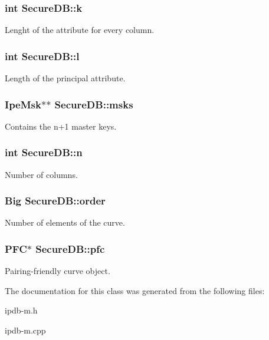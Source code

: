 \subsubsection[{\texorpdfstring{k}{k}}]{\setlength{\rightskip}{0pt plus 5cm}int Secure\+D\+B\+::k}\hypertarget{classSecureDB_a1c0171e735bb38a78af19fb5b530557a}{}\label{classSecureDB_a1c0171e735bb38a78af19fb5b530557a}
Lenght of the attribute for every column. 
\subsubsection[{\texorpdfstring{l}{l}}]{\setlength{\rightskip}{0pt plus 5cm}int Secure\+D\+B\+::l}\hypertarget{classSecureDB_ab8f7de0f939b03278cabc7d9c4d248df}{}\label{classSecureDB_ab8f7de0f939b03278cabc7d9c4d248df}
Length of the principal attribute. 
\subsubsection[{\texorpdfstring{msks}{msks}}]{\setlength{\rightskip}{0pt plus 5cm}Ipe\+Msk$\ast$$\ast$ Secure\+D\+B\+::msks}\hypertarget{classSecureDB_a7c64d61dc130f025e769937a0303e301}{}\label{classSecureDB_a7c64d61dc130f025e769937a0303e301}
Contains the n+1 master keys. 
\subsubsection[{\texorpdfstring{n}{n}}]{\setlength{\rightskip}{0pt plus 5cm}int Secure\+D\+B\+::n}\hypertarget{classSecureDB_ae034772516922899c09a0e2790dac008}{}\label{classSecureDB_ae034772516922899c09a0e2790dac008}
Number of columns. 
\subsubsection[{\texorpdfstring{order}{order}}]{\setlength{\rightskip}{0pt plus 5cm}Big Secure\+D\+B\+::order}\hypertarget{classSecureDB_ae2cdeef405f4711ca5e17c6052c1d78a}{}\label{classSecureDB_ae2cdeef405f4711ca5e17c6052c1d78a}
Number of elements of the curve. 
\subsubsection[{\texorpdfstring{pfc}{pfc}}]{\setlength{\rightskip}{0pt plus 5cm}P\+FC$\ast$ Secure\+D\+B\+::pfc}\hypertarget{classSecureDB_a3feb6fe6c3928b757edcf0a04573bb1a}{}\label{classSecureDB_a3feb6fe6c3928b757edcf0a04573bb1a}
Pairing-\/friendly curve object. 

The documentation for this class was generated from the following files\+:\begin{DoxyCompactItemize}
\item 
ipdb-\/m.\+h\item 
ipdb-\/m.\+cpp\end{DoxyCompactItemize}
